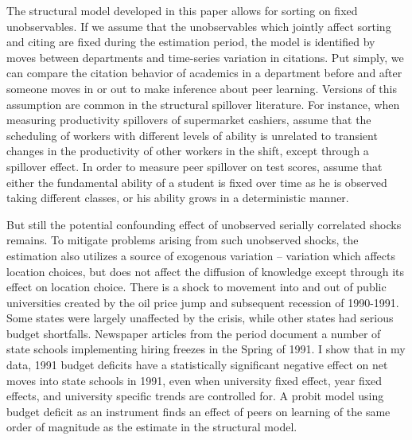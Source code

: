 The structural model developed in this paper allows for sorting on fixed
unobservables. If we assume that the unobservables which jointly affect
sorting and citing are fixed during the estimation period, the model is
identified by moves between departments and time-series variation in
citations. Put simply, we can compare the citation behavior of academics
in a department before and after someone moves in or out to make
inference about peer learning. Versions of this assumption are common in
the structural spillover literature. For instance, when measuring
productivity spillovers of supermarket cashiers, \citet{mas2009peers}
assume that the scheduling of workers with different levels of ability is unrelated
to transient changes in the productivity of other workers in the shift,
except through a spillover effect.\footnotemark{}
In order to measure peer spillover on test scores,
\citet{arcidiacono2012estimating} assume that either the fundamental ability of a
student is fixed over time as he is observed taking different classes,
or his ability grows in a deterministic manner.

But still the potential confounding effect of unobserved serially
correlated shocks remains. To mitigate problems arising from such
unobserved shocks, the estimation also utilizes a source of exogenous
variation -- variation which affects location choices, but does not
affect the diffusion of knowledge except through its effect on location
choice. There is a shock to movement into and out of public universities
created by the oil price jump and subsequent recession of 1990-1991.
Some states were largely unaffected by the crisis, while other states
had serious budget shortfalls. Newspaper articles from the period
document a number of state schools implementing hiring freezes in the
Spring of 1991. I show that in my data, 1991 budget deficits have a
statistically significant negative effect on net moves into state
schools in 1991, even when university fixed effect, year fixed effects,
and university specific trends are controlled for. A probit model
using budget deficit as an instrument finds an effect of peers on
learning of the same order of magnitude as the estimate in the
structural model.

